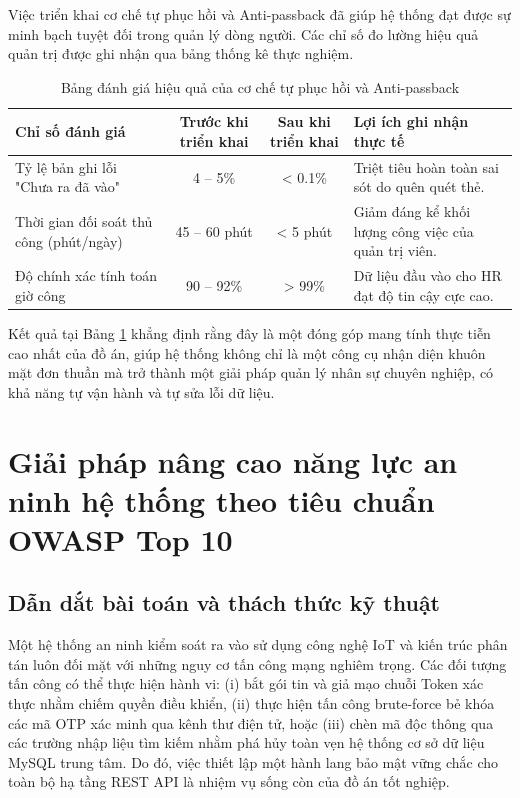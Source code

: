\documentclass[../DoAn.tex]{subfiles}
\begin{document}
Việc triển khai cơ chế tự phục hồi và Anti-passback đã giúp hệ thống đạt được sự minh bạch tuyệt đối trong quản lý dòng người. Các chỉ số đo lường hiệu quả quản trị được ghi nhận qua bảng thống kê thực nghiệm.

\begin{table}[ht!]
\centering
\small
\renewcommand{\arraystretch}{1.3}
\caption{Bảng đánh giá hiệu quả của cơ chế tự phục hồi và Anti-passback}
\label{tab:antipassback_efficiency}
\begin{tabular}{|p{4.5cm}|c|c|p{5.5cm}|}
\hline
\textbf{Chỉ số đánh giá} & \textbf{Trước khi triển khai} & \textbf{Sau khi triển khai} & \textbf{Lợi ích ghi nhận thực tế} \\ \hline
Tỷ lệ bản ghi lỗi "Chưa ra đã vào" & 4 -- 5\% & < 0.1\% & Triệt tiêu hoàn toàn sai sót do quên quét thẻ. \\ \hline
Thời gian đối soát thủ công (phút/ngày) & 45 -- 60 phút & < 5 phút & Giảm đáng kể khối lượng công việc của quản trị viên. \\ \hline
Độ chính xác tính toán giờ công & 90 -- 92\% & > 99\% & Dữ liệu đầu vào cho HR đạt độ tin cậy cực cao. \\ \hline
\end{tabular}
\end{table}

Kết quả tại Bảng \ref{tab:antipassback_efficiency} khẳng định rằng đây là một đóng góp mang tính thực tiễn cao nhất của đồ án, giúp hệ thống không chỉ là một công cụ nhận diện khuôn mặt đơn thuần mà trở thành một giải pháp quản lý nhân sự chuyên nghiệp, có khả năng tự vận hành và tự sửa lỗi dữ liệu.

\section{Giải pháp nâng cao năng lực an ninh hệ thống theo tiêu chuẩn OWASP Top 10}
\label{section:5.4}

\subsection{Dẫn dắt bài toán và thách thức kỹ thuật}

Một hệ thống an ninh kiểm soát ra vào sử dụng công nghệ IoT và kiến trúc phân tán luôn đối mặt với những nguy cơ tấn công mạng nghiêm trọng. Các đối tượng tấn công có thể thực hiện hành vi: (i) bắt gói tin và giả mạo chuỗi Token xác thực nhằm chiếm quyền điều khiển, (ii) thực hiện tấn công brute-force bẻ khóa các mã OTP xác minh qua kênh thư điện tử, hoặc (iii) chèn mã độc thông qua các trường nhập liệu tìm kiếm nhằm phá hủy toàn vẹn hệ thống cơ sở dữ liệu MySQL trung tâm. Do đó, việc thiết lập một hành lang bảo mật vững chắc cho toàn bộ hạ tầng REST API là nhiệm vụ sống còn của đồ án tốt nghiệp.
\end{document}
